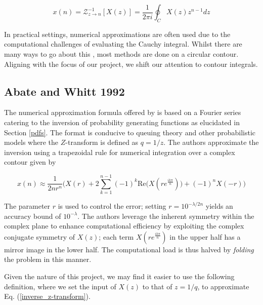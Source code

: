 \documentclass[a4paper]{report}
\begin{document}
\begin{equation}\label{inverse_z-transform}
	x(n) = \mathcal{Z}^{-1}_{z \rightarrow n}[X(z)] = \frac{1}{2\pi i} \oint_C X(z)z^{n-1}dz
\end{equation}

In practical settings, numerical approximations are often used due to the computational challenges of evaluating the Cauchy integral. Whilst there are many ways to go about this \citep{merrikh2014linearsys,rajkovic2004method,horvath2020numerical}, most methods are done on a circular contour. Aligning with the focus of our project, we shift our attention to contour integrals.


\subsection{Abate and Whitt 1992}\label{abate_whitt_section}
The numerical approximation formula offered by \citet{AbateWhitt1992a, AbateWhitt1992b} is based on a Fourier series catering to the inversion of probability generating functions as elucidated in Section \ref{pdfs}. The format is conducive to queuing theory and other probabilistic models where the $Z$-transform is defined as $q = 1 / z$. The authors approximate the inversion using a trapezoidal rule for numerical integration over a complex contour given by

\begin{equation}\label{aw_inversion_original}
	x(n) \approx \frac{1}{2nr^n} \biggr( X(r) + 2\sum^{n-1}_{k = 1} (-1)^k \mathrm{Re}\bigg( X(re^{\frac{ik\pi}{n}})\bigg) + (-1)^nX(-r) \biggl)
\end{equation}

The parameter $r$ is used to control the error; setting $r = 10^{-\lambda / 2n}$ yields an accuracy bound of $10^{-\lambda}$. The authors leverage the inherent symmetry within the complex plane to enhance computational efficiency by exploiting the complex conjugate symmetry of $X(z)$; each term $X(re^{\frac{ik\pi}{n}})$ in the upper half has a mirror image in the lower half. The computational load is thus halved by \textit{folding} the problem in this manner.

Given the nature of this project, we may find it easier to use the following definition, where we set the input of $X(z)$ to that of $z = 1 / q$, to approximate Eq. (\ref{inverse_z-transform}).
\end{document}
